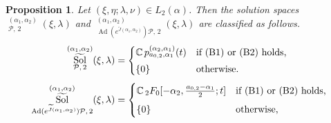 \documentclass[a4paper,11pt,reqno]{amsart}
\newcommand{\CC}{\mathbb{C}}
\newcommand{\calP}{\mathcal{P}}
\newcommand{\0}{{\bf 0}}
\newcommand{\1}{{\bf 1}}
\DeclareMathOperator{\Ad}{Ad}
\DeclareMathOperator{\Sol}{Sol}
\newcommand{\wJ}{\widetilde{J}}
\DeclareMathOperator{\wSol}{\widetilde{\Sol}}
\theoremstyle{plain}
\newtheorem{proposition}[equation]{Proposition}
\theoremstyle{definition}
\numberwithin{equation}{section}
\theoremstyle{definition}
\begin{document}
\begin{proposition}\label{prop:SolD2}
Let $(\xi, \eta; \lambda, \nu) \in L_2(\alpha)$.
Then the solution spaces
$\wSol_{\calP,\, 2}^{(\alpha_1,\alpha_2)}(\xi,\lambda)$ and 
$\wSol_{\Ad(e^{\wJ(\alpha_1,\alpha_2)}) \calP,\, 2}^{(\alpha_1,\alpha_2)}(\xi,\lambda)$
are classified as follows.
\begin{align*}
\wSol_{\calP,\, 2}^{(\alpha_1,\alpha_2)}(\xi,\lambda)
&=
\begin{cases}
\CC\,
p_{a_{0,2},\alpha_1}^{(\alpha_2,\alpha_1)}(t) & 
\textnormal{if (B1) or (B2) holds,}\\[3pt]
\{0\} & \textnormal{otherwise.}
\end{cases}\\[3pt]
\wSol_{\Ad(e^{\wJ(\alpha_1,\alpha_2)}) \calP,\, 2}^{(\alpha_1,\alpha_2)}(\xi,\lambda)
&=
\begin{cases}
\CC\, 
{}_2F_0[-\alpha_2,\tfrac{a_{0,2}-\alpha_1}{2};t]
& 
\textnormal{if (B1) or (B2) holds,}\\[5pt]
\{0\} & \textnormal{otherwise,}
\end{cases}
\end{align*}
\end{proposition}
\end{document}
